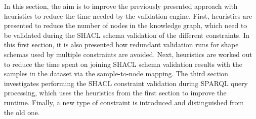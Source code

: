 In this section, the aim is to improve the previously presented approach with heuristics to reduce the time needed by the validation engine. First, heuristics are presented to reduce the number of nodes in the knowledge graph, which need to be validated during the SHACL schema validation of the different constraints. In this first section, it is also presented how redundant validation runs for shape schemas used by multiple constraints are avoided. Next, heuristics are worked out to reduce the time spent on joining SHACL schema validation results with the samples in the dataset via the sample-to-node mapping. The third section investigates performing the SHACL constraint validation during SPARQL query processing, which uses the heuristics from the first section to improve the runtime. Finally, a new type of constraint is introduced and distinguished from the old one.